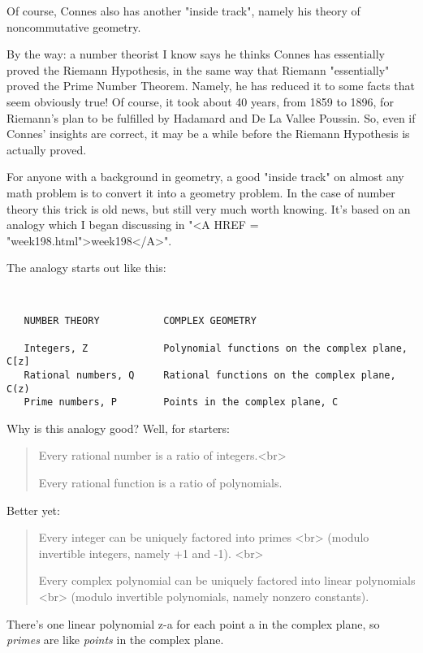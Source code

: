 Of course, Connes also has another "inside track", namely
his theory of noncommutative geometry.

By the way: a number theorist I know says he thinks Connes has
essentially proved the Riemann Hypothesis, in the same way that
Riemann "essentially" proved the Prime Number Theorem.
Namely, he has reduced it to some facts that seem obviously true!  Of
course, it took about 40 years, from 1859 to 1896, for Riemann's plan
to be fulfilled by Hadamard and De La Vallee Poussin.  So, even if
Connes' insights are correct, it may be a while before the Riemann
Hypothesis is actually proved.

For anyone with a background in geometry, a good "inside track" 
on almost any math problem is to convert it into a geometry problem.  
In the case of number theory this trick is old news, but still very much 
worth knowing.  It's based on an analogy which I began discussing in 
"<A HREF = "week198.html">week198</A>".  

The analogy starts out like this:


\begin{verbatim}


   NUMBER THEORY           COMPLEX GEOMETRY                               

   Integers, Z             Polynomial functions on the complex plane, C[z]
   Rational numbers, Q     Rational functions on the complex plane, C(z)
   Prime numbers, P        Points in the complex plane, C           

\end{verbatim}
    

Why is this analogy good?   Well, for starters:

\begin{quote}
   Every rational number is a ratio of integers.<br>

   Every rational function is a ratio of polynomials.  
\end{quote}
Better yet:

\begin{quote}
   Every integer can be uniquely factored into primes <br>
   (modulo invertible integers, namely +1 and -1). <br>

   Every complex polynomial can be uniquely factored into linear polynomials <br>
   (modulo invertible polynomials, namely nonzero constants).
\end{quote}
There's one linear polynomial z-a for each point a in the complex plane, 
so \emph{primes} are like \emph{points} in the complex plane. 


